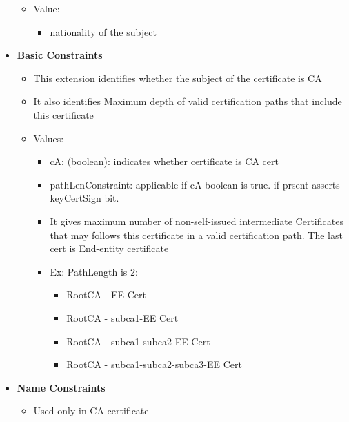 \documentclass[12pt]{report}
\begin{document}
\begin{itemize}
\begin{itemize}
                    \item Value:
                        \begin{itemize}
                            \item nationality of the subject
                        \end{itemize}
                \end{itemize}
            \item \textbf{Basic Constraints}
                \begin{itemize}
                    \item This extension identifies whether the subject of the certificate is CA 
                    \item It also identifies Maximum depth of valid certification paths that include this certificate
                    \item Values:
                        \begin{itemize}
                            \item cA: (boolean): indicates whether certificate is CA cert
                            \item pathLenConstraint: applicable if cA boolean is true. if prsent asserts keyCertSign bit. 
                            \item It gives maximum number of non-self-issued intermediate Certificates that may follows this certificate in a valid certification path. The last cert is End-entity certificate
                            \item Ex: PathLength is 2:
                                \begin{itemize}
                                    \item RootCA - EE Cert
                                    \item RootCA - subca1-EE Cert
                                    \item RootCA - subca1-subca2-EE Cert
                                    \item RootCA - subca1-subca2-subca3-EE Cert
                                \end{itemize}
                        \end{itemize}
                \end{itemize}
            \item \textbf{Name Constraints}
                \begin{itemize}
                    \item Used only in CA certificate

\end{itemize}
\end{itemize}
\end{document}
